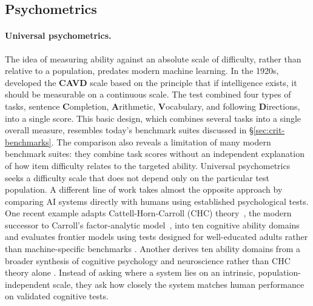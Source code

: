 \documentclass[acmsmall,screen,review,anonymous]{acmart}
\begin{document}
\subsection{Psychometrics}
\label{sec:crit-psycho}
\paragraph{Universal psychometrics.}
\label{paragraph:universal}
The idea of measuring ability against an absolute scale of difficulty, rather than relative to a population, predates modern machine learning.
%
In the 1920s, \citet{thorndike1926measurement} developed the \textbf{CAVD} scale based on the principle that if intelligence exists, it should be measurable on a continuous scale. 
%
The test combined four types of tasks, sentence \textbf{C}ompletion, \textbf{A}rithmetic, \textbf{V}ocabulary, and following \textbf{D}irections, into a single score.
%
This basic design, which combines several tasks into a single overall measure, resembles today's benchmark suites discussed in \S\ref{sec:crit-benchmarks}.
%
The comparison also reveals a limitation of many modern benchmark suites: they combine task scores without an independent explanation of how item difficulty relates to the targeted ability.
%
Universal psychometrics seeks a difficulty scale that does not depend only on the particular test population.
%
A different line of work takes almost the opposite approach by comparing AI systems directly with humans using established psychological tests.
%
One recent example adapts Cattell-Horn-Carroll (CHC) theory~\citep{MCGREW20091}, the modern successor to Carroll's factor-analytic model~\citep{carroll1993}, into ten cognitive ability domains and evaluates frontier models using tests designed for well-educated adults rather than machine-specific benchmarks \citep{hendrycks2025definitionagi}.
%
Another derives ten ability domains from a broader synthesis of cognitive psychology and neuroscience rather than CHC theory alone \citep{burnell2026measuringprogressagicognitive}.
%
Instead of asking where a system lies on an intrinsic, population-independent scale, they ask how closely the system matches human performance on validated cognitive tests.
\end{document}
